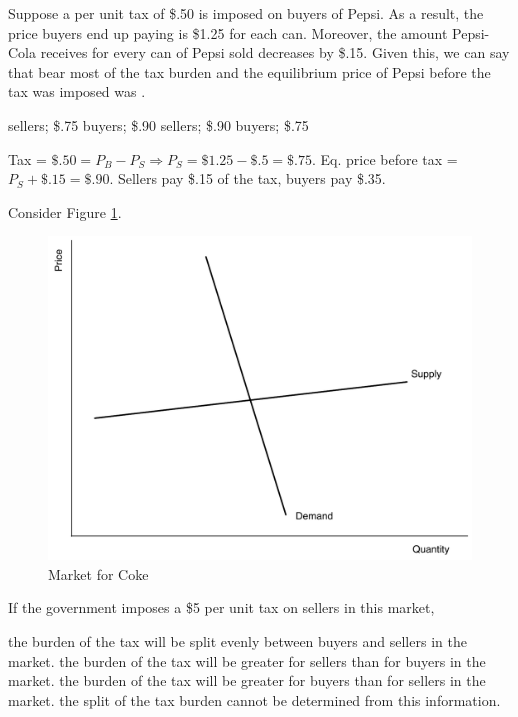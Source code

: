 \documentclass[addpoints,11pt]{exam}
\theoremstyle{definition}
\newcommand{\blank}[0]{\underline{\hspace{3cm}}}
\begin{document}
\begin{questions}
	
	
		\question Suppose a per unit tax of \$.50 is imposed on buyers of Pepsi. As a result, the price buyers end up paying is \$1.25 for each can. Moreover, the amount Pepsi-Cola receives for every can of Pepsi sold decreases by \$.15. Given this, we can say that \blank bear most of the tax burden and the equilibrium price of Pepsi before the tax was imposed was \blank.
		
		\begin{choices}
			\choice sellers; \$.75
			\CorrectChoice buyers; \$.90
			\choice sellers; \$.90
			\choice buyers; \$.75
		\end{choices}
	
	\begin{solution}
		Tax = $\$.50 = P_B - P_S \Rightarrow P_S = \$1.25-\$.5 = \$.75.$ Eq. price before tax = $P_S + \$.15 = \$.90$. Sellers pay \$.15 of the tax, buyers pay \$.35.
	\end{solution}
		
	
	\question Consider Figure \ref{fig1}. 
	
	\begin{figure}[H]
		\centering
		\includegraphics[scale=.45]{Exam1_MC19.pdf}
		\caption{Market for Coke}
		\label{fig1}
	\end{figure}
	
	If the government imposes a \$5 per unit tax on sellers in this market,  
	
	\begin{choices}
		\choice the burden of the tax will be split evenly between buyers and sellers in the market.
		\choice the burden of the tax will be greater for sellers than for buyers in the market.
		\CorrectChoice the burden of the tax will be greater for buyers than for sellers in the market.
		\choice the split of the tax burden cannot be determined from this information. 
	\end{choices}
	

\end{questions}
\end{document}
